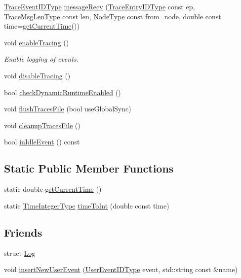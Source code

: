 \begin{DoxyCompactItemize}
\item 
\hyperlink{namespacevt_1_1trace_a64a7185f3e102df8d8258f263ccd1582}{Trace\+Event\+I\+D\+Type} \hyperlink{structvt_1_1trace_1_1_trace_aa14d58fb03a226e213f72bb03a13bb9f}{message\+Recv} (\hyperlink{namespacevt_1_1trace_a3c14050715ba9eceaeff51fb3de64f2f}{Trace\+Entry\+I\+D\+Type} const ep, \hyperlink{namespacevt_1_1trace_aeb598f45d67d41db7902e494f2f0ce59}{Trace\+Msg\+Len\+Type} const len, \hyperlink{namespacevt_a866da9d0efc19c0a1ce79e9e492f47e2}{Node\+Type} const from\+\_\+node, double const time=\hyperlink{structvt_1_1trace_1_1_trace_a04cf6b76b4ced1bc90d246a34c948db5}{get\+Current\+Time}())
\item 
void \hyperlink{structvt_1_1trace_1_1_trace_ae7ef14764ce87e0ea8baf802db400066}{enable\+Tracing} ()
\begin{DoxyCompactList}\small\item\em Enable logging of events. \end{DoxyCompactList}\item 
void \hyperlink{structvt_1_1trace_1_1_trace_a54f34dbcf8960de7b319e44ef9b76eb0}{disable\+Tracing} ()
\item 
bool \hyperlink{structvt_1_1trace_1_1_trace_a4b911a4f90a4b6b76c03341db7d94fdd}{check\+Dynamic\+Runtime\+Enabled} ()
\item 
void \hyperlink{structvt_1_1trace_1_1_trace_a2e07094a48c47b9c591003f0b57305c7}{flush\+Traces\+File} (bool use\+Global\+Sync)
\item 
void \hyperlink{structvt_1_1trace_1_1_trace_ac764c356a7f81abadfe643d618f22b15}{cleanup\+Traces\+File} ()
\item 
bool \hyperlink{structvt_1_1trace_1_1_trace_a1e7429d95dbddd9f235a02800d158d36}{in\+Idle\+Event} () const
\end{DoxyCompactItemize}
\subsection*{Static Public Member Functions}
\begin{DoxyCompactItemize}
\item 
static double \hyperlink{structvt_1_1trace_1_1_trace_a04cf6b76b4ced1bc90d246a34c948db5}{get\+Current\+Time} ()
\item 
static \hyperlink{structvt_1_1trace_1_1_trace_ab8db9218a8ab87f59773fcbf81433787}{Time\+Integer\+Type} \hyperlink{structvt_1_1trace_1_1_trace_a0b3d919285d2f0f33cebfb2ecbc9ad00}{time\+To\+Int} (double const time)
\end{DoxyCompactItemize}
\subsection*{Friends}
\begin{DoxyCompactItemize}
\item 
struct \hyperlink{structvt_1_1trace_1_1_trace_add132ae9df1b7ef820c8082c32b0f839}{Log}
\item 
void \hyperlink{structvt_1_1trace_1_1_trace_a17caa1eeb27fd6a4af8786a7f0679d77}{insert\+New\+User\+Event} (\hyperlink{namespacevt_1_1trace_a5908920d051c144c89f17c69ed262350}{User\+Event\+I\+D\+Type} event, std\+::string const \&name)
\end{DoxyCompactItemize}


